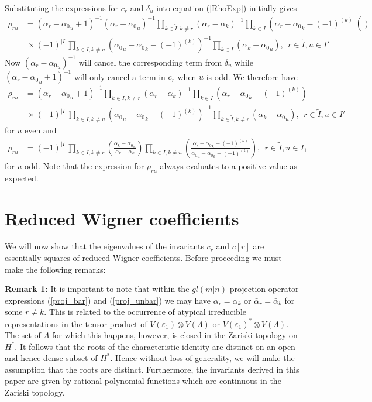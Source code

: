 \documentclass[12pt]{article}
\begin{document}
Substituting the expressions for ${c}_r$ and ${\delta}_u$ into equation 
 (\ref{RhoExp}) initially gives
\begin{align*}
{\rho}_{ru} &= ({\alpha}_r-{\alpha_0}_u + 1)^{-1}({\alpha}_r-{\alpha_0}_u)^{-1} \prod_{k\in \tilde{I},k\neq r} \left(\alpha_r - \alpha_k \right)^{-1}\prod_{k\in
I} \left(\alpha_r - {\alpha_0}_k - (-1)^{(k)}\right() \\
& ~\times (-1)^{|I|} \prod_{k\in I,k\neq u} \left({\alpha_0}_u - {\alpha_0}_k -
(-1)^{(k)}\right)^{-1}\prod_{k\in\tilde{I}} \left(\alpha_k - {\alpha_0}_u \right),\ \ r\in \tilde{I},u\in I' 
\end{align*}
Now $({\alpha}_r-{\alpha_0}_u)^{-1}$ will cancel the corresponding term from $\delta_u$ while $
({\alpha}_r-{\alpha_0}_u + 1)^{-1}$ will only cancel a term in $c_r$ when $u$ is odd. We therefore have
\begin{align*}
{\rho}_{ru} &= ({\alpha}_r-{\alpha_0}_u + 1)^{-1}\prod_{k\in \tilde{I},k\neq r} \left(\alpha_r - \alpha_k \right)^{-1}\prod_{k\in
I} \left(\alpha_r - {\alpha_0}_k - (-1)^{(k)}\right) \\
& ~\times (-1)^{|I|} \prod_{k\in I,k\neq u} \left({\alpha_0}_u - {\alpha_0}_k -
(-1)^{(k)}\right)^{-1}\prod_{k\in\tilde{I},k \neq r} \left(\alpha_k - {\alpha_0}_u \right),\ \ r\in \tilde{I},u\in I' 
\end{align*}
for $u$ even and
\begin{align*}
{\rho}_{ru} &= (-1)^{|I|} \prod_{k\in \tilde{I},k\neq r} 
\left(
\frac 
{\alpha_k - {\alpha_0}_u  }
{\alpha_r - \alpha_k }
\right)
\prod_{k\in I,k \neq u} 
\left(
\frac
{ \alpha_r - {\alpha_0}_k - (-1)^{(k)} }
{{\alpha_0}_u - {\alpha_0}_k - (-1)^{(k)} }
\right)
,\ \ r\in \tilde{I},u\in I_1
\end{align*}
for $u$ odd.
Note that the expression for $\rho_{ru}$ always evaluates to a positive value as expected.

\section{Reduced Wigner coefficients} 
\label{Wigner}

We will now show that the eigenvalues of the invariants $\bar{c}_r$ and $c[r]$ are 
essentially squares of reduced Wigner coefficients. Before proceeding we must make the following remarks:

{\bf Remark 1:} 
It is important to note that within the $gl(m|n)$ projection operator expressions (\ref{proj_bar}) and (\ref{proj_unbar}) we may have $\alpha_r = \alpha_k$ or $\bar{\alpha}_r = \bar{\alpha}_k$ for some $r \neq k$. This is related to the occurrence of atypical irreducible representations in the tensor product
of $V({\varepsilon_1})\otimes V(\Lambda)$ or $V({\varepsilon_1})^*\otimes V(\Lambda)$. The
set of $\Lambda$ for which this happens, however, is closed in the Zariski topology
\cite{Hump1972} on $H^*$. It follows that the roots of the characteristic identity are distinct on an open and hence dense subset of
$H^*$. Hence without loss of generality, we will make the assumption that the roots are distinct. Furthermore, the invariants derived in this paper are given by rational
polynomial functions which are continuous in the Zariski topology. 
\end{document}

